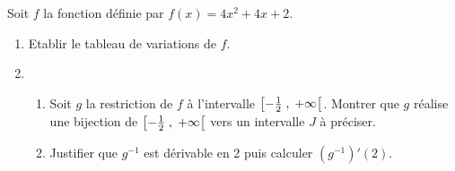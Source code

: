 \begin{exercice}
Soit $ f $ la fonction définie par $ f(x)=4x^{2}+4x+2  $.
 \begin{enumerate}
\item Etablir  le tableau de variations   de $ f $. 
\item
\begin{enumerate}
\item Soit $ g $ la restriction de $ f $ à l'intervalle  $ \left[-\frac{1}{2} \;,\; +\infty\right[ $.
 Montrer que  $ g $  réalise une bijection  de $ \left[-\frac{1}{2} \;,\; +\infty\right[ $ vers un intervalle  $ J $ à préciser.
\item Justifier que $ g^{-1} $ est dérivable en 2 puis  calculer $(g^{-1})'(2) $.
\end{enumerate}
\end{enumerate}

\end{exercice}
